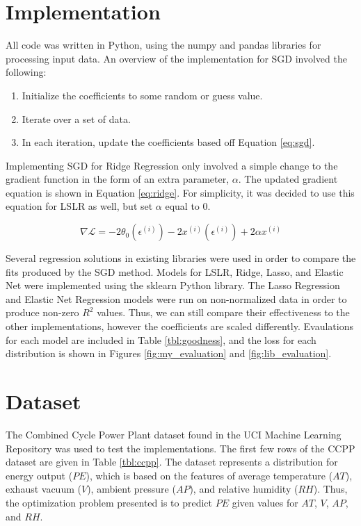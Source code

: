 \documentclass[letterpaper]{article} %
\begin{document}
\section{Implementation}
All code was written in Python, using the numpy and pandas
libraries for processing input data.
An overview of the implementation for SGD involved the following:

\begin{enumerate}
\item Initialize the coefficients to some random or guess value.
\item Iterate over a set of data.
\item In each iteration, update the coefficients based off Equation \ref{eq:sgd}.
\end{enumerate}

Implementing SGD for Ridge Regression only involved a simple change to the
gradient function in the form of an extra parameter, $\alpha$.
The updated gradient equation is shown in Equation \ref{eq:ridge}.
For simplicity, it was decided to use this equation for LSLR as well,
but set $\alpha$ equal to 0.

\begin{equation}
\label{eq:ridge}
\nabla \mathcal{L} = -2\theta_0(\epsilon^{(i)}) - 2x^{(i)}(\epsilon^{(i)}) + 2\alpha x^{(i)}
\end{equation}

Several regression solutions in existing libraries were used in order to compare the fits
produced by the SGD method.
Models for LSLR, Ridge, Lasso, and Elastic Net
were implemented using the sklearn Python library.
The Lasso Regression and Elastic Net Regression models
were run on non-normalized data in order to produce non-zero $R^2$ values.
Thus, we can still compare their effectiveness to the other implementations,
however the coefficients are scaled differently.
Evaulations for each model are included in Table \ref{tbl:goodness},
and the loss for each distribution is shown in Figures \ref{fig:my_evaluation} and \ref{fig:lib_evaluation}.


\section{Dataset}
The Combined Cycle Power Plant dataset
found in the UCI Machine Learning Repository was used to test the implementations.
The first few rows of the CCPP dataset are given in
Table \ref{tbl:ccpp}.
The dataset represents a distribution for energy output ($PE$),
which is based on the features of
average temperature ($AT$),
exhaust vacuum ($V$),
ambient pressure ($AP$),
and relative humidity ($RH$).
Thus, the optimization problem presented is to predict $PE$ given
values for $AT$, $V$, $AP$, and $RH$.
\end{document}
